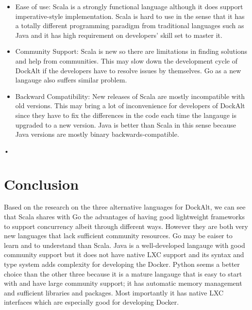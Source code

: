 \documentclass[letterpaper,twocolumn,10pt]{article}
\begin{document}
\begin{itemize} 
\item Ease of use: Scala is a strongly functional language although it does support imperative-style implementation. Scala is hard to use in the sense that it has a totally different programming paradigm from traditional languages such as Java and it has high requirement on developers' skill set to master it. 
\item Community Support: Scala is new so there are limitations in finding solutions and help from communities. This may slow down the development cycle of DockAlt if the developers have to resolve issues by themselves. Go as a new langauge also suffers similar problem.
\item Backward Compatibility: New releases of Scala are mostly incompatible with old versions. This may bring a lot of inconvenience for developers of DockAlt since they have to fix the differences in the code each time the langauge is upgraded to a new version. Java is better than Scala in this sense because Java versions are mostly binary backwards-compatible.

\end{itemize}•



\section{Conclusion}
Based on the research on the three alternative languages for DockAlt, we can see that Scala shares with Go the advantages of having good lightweight frameworks to support concurrency albeit through different ways. However they are both very new languages that lack sufficient community resources. Go may be eaiser to learn and to understand than Scala. Java is a well-developed langauge with good community support but it does not have native LXC support and its syntax and type system adds complexity for developing the Docker. Python seems a better choice than the other three because it is a mature langauge that is easy to start with and have large community support; it has automatic memory management and sufficient libraries and packages. Most importantly it has native LXC interfaces which are especially good for developing Docker.
\end{document}
